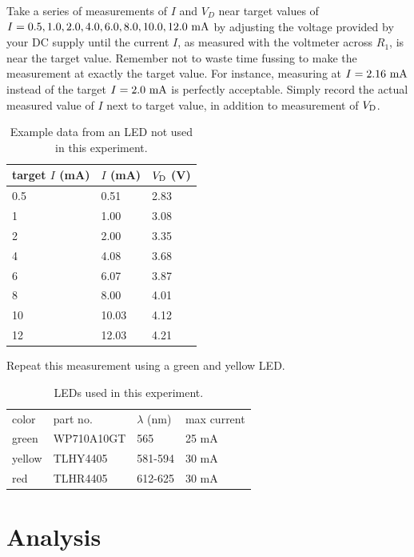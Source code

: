 Take a series of measurements of $I$ and $V_D$ near target values of
$I = 0.5,1.0,2.0,4.0,6.0,8.0,10.0,12.0~\rm mA$ by adjusting the
voltage provided by your DC supply until the current $I$, as measured
with the voltmeter across $R_1$, is near the target value.  Remember
not to waste time fussing to make the measurement at exactly the
target value.  For instance, measuring at $I=2.16~\rm mA$ instead of
the target $I=2.0 ~\rm mA$ is perfectly acceptable.  Simply record the
actual measured value of $I$ next to target value, in addition to
measurement of $V_{\rm D}$.  

\begin{table}
\begin{center}
\caption{Example data from an LED not used in this experiment.}
\begin{tabular}{lll}
target $I$ (mA) & $I$ (mA) & $V_{\rm D}$ (V) \\
\hline
0.5 &  0.51 & 2.83 \\
1   &  1.00 & 3.08 \\
2   &  2.00 & 3.35 \\
4   &  4.08 & 3.68 \\
6   &  6.07 & 3.87 \\
8   &  8.00 & 4.01 \\
10  & 10.03 & 4.12 \\
12  & 12.03 & 4.21 \\
\end{tabular}
\end{center}
\end{table}

Repeat this measurement using a green and yellow LED.

\begin{table}[htbp]
\begin{center}
\caption{LEDs used in this experiment.}
\begin{tabular}{llll}
color & part no. & $\lambda$ (nm) & max current \\
green & WP710A10GT & 565 & 25 mA \\  
yellow & TLHY4405 & 581-594 & 30 mA \\ 
red & TLHR4405 & 612-625 & 30 mA \\ 
\end{tabular}
\end{center}
\end{table}

\section{Analysis}

